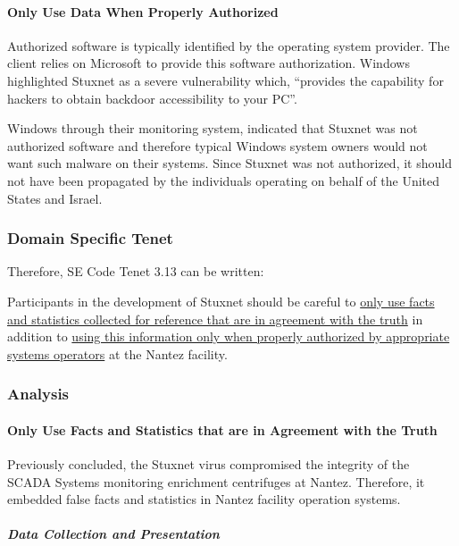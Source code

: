 \documentclass[12pt]{article}
\begin{document}
\begin{multicols}{2}
\paragraph{Only Use Data When Properly Authorized}

Authorized software is typically identified by the operating system provider. The client relies on Microsoft to provide this software authorization. Windows highlighted Stuxnet as a severe vulnerability which, ``provides the capability for hackers to obtain backdoor accessibility to your PC''.\cite{w32.stuxnetDossier}

Windows through their monitoring system, indicated that Stuxnet was not authorized software and therefore typical Windows system owners would not want such malware on their systems. Since Stuxnet was not authorized, it should not have been propagated by the individuals operating on behalf of the United States and Israel.

\subsubsection{Domain Specific Tenet}

Therefore, SE Code Tenet 3.13 can be written:

\begin{framed}
Participants in the development of Stuxnet should be careful to \ul{only use facts and statistics collected for reference that are in agreement with the truth} in addition to \ul{using this information only when properly authorized by appropriate systems operators} at the Nantez facility.
\end{framed}

\subsubsection{Analysis}

\paragraph{Only Use Facts and Statistics that are in Agreement with the Truth}

Previously concluded, the Stuxnet virus compromised the integrity of the SCADA Systems monitoring enrichment centrifuges at Nantez.\cite{lessonsFromStuxnet} Therefore, it embedded false facts and statistics in Nantez facility operation systems.

\subparagraph{Data Collection and Presentation}


\end{multicols}
\end{document}
